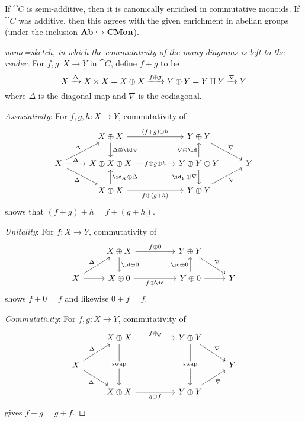 \documentclass[../main.tex]{subfiles}
\begin{document}
\begin{lem}\label{lem:enrichment-commutative-monoids}
  If $\cat C$ is semi-additive, then it is canonically enriched in commutative monoids. If $\cat C$ was additive, then this agrees with the given enrichment in abelian groups (under the inclusion $\mathbf{Ab} \hookrightarrow \mathbf{CMon}$).
\end{lem}
\begin{proof}[name={sketch, in which the commutativity of the many diagrams is left to the reader}]
  For $f, g\colon X \to Y$ in $\cat C$, define $f + g$ to be
  \[
    X \xrightarrow{\Delta} X \times X = X \oplus X \xrightarrow{f \oplus g} Y \oplus Y = Y \amalg Y \xrightarrow{\nabla} Y
  \] where $\Delta$ is the diagonal map and $\nabla$ is the codiagonal.

  \emph{Associativity}: For $f, g, h\colon X\to Y$, commutativity of 
\[\begin{tikzcd}
  & {X\oplus X} && {Y\oplus Y} \\
  X & {X\oplus X\oplus X} && {Y\oplus Y\oplus Y} & Y \\
  & {X\oplus X} && {Y\oplus Y}
  \arrow["\Delta", from=2-1, to=1-2]
  \arrow["{\id_X \oplus \Delta}"', from=3-2, to=2-2]
  \arrow["{\Delta \oplus \id_X}", from=1-2, to=2-2]
  \arrow["\Delta", from=2-1, to=2-2]
  \arrow["\Delta"', from=2-1, to=3-2]
  \arrow["{f \oplus(g+h)}"', from=3-2, to=3-4]
  \arrow["{(f+g)\oplus h}", from=1-2, to=1-4]
  \arrow["{\nabla \oplus \id}", from=2-4, to=1-4]
  \arrow["{\id_Y \oplus \nabla}"', from=2-4, to=3-4]
  \arrow["\nabla"', from=3-4, to=2-5]
  \arrow["\nabla", from=1-4, to=2-5]
  \arrow["{f\oplus g\oplus h}"{description}, from=2-2, to=2-4]
\end{tikzcd}\]  
  shows that $(f+g) + h = f + (g + h)$.

  \emph{Unitality}: For $f\colon X \to Y$, commutativity of 
\[\begin{tikzcd}
  & {X\oplus X} && {Y\oplus Y} \\
  X & {X \oplus 0} && {Y\oplus 0} & Y
  \arrow[from=2-1, to=2-2]
  \arrow["\id\oplus0", from=1-2, to=2-2]
  \arrow["\Delta", from=2-1, to=1-2]
  \arrow["{f\oplus \id}"', from=2-2, to=2-4]
  \arrow["{f\oplus 0}", from=1-2, to=1-4]
  \arrow["\nabla", from=1-4, to=2-5]
  \arrow[from=2-4, to=2-5]
  \arrow["{\id \oplus 0}", from=2-4, to=1-4]
\end{tikzcd}\]  
   shows $f + 0 = f$ and likewise $ 0 + f = f$.

   \emph{Commutativity}: For $f,g\colon X \to Y$, commutativity of 
\[\begin{tikzcd}
  & {X\oplus X} && {Y\oplus Y} \\
  X &&&& Y \\
  & {X\oplus X} && {Y\oplus Y}
  \arrow["\nabla", from=1-4, to=2-5]
  \arrow["\nabla"', from=3-4, to=2-5]
  \arrow["{g \oplus f}"', from=3-2, to=3-4]
  \arrow["{f\oplus g}", from=1-2, to=1-4]
  \arrow["\Delta", from=2-1, to=1-2]
  \arrow["\Delta"', from=2-1, to=3-2]
  \arrow["{\text{swap}}"{description}, from=1-2, to=3-2]
  \arrow["{\text{swap}}"{description}, from=1-4, to=3-4]
\end{tikzcd}\]   gives $f + g = g + f$.


\end{proof}
\end{document}
